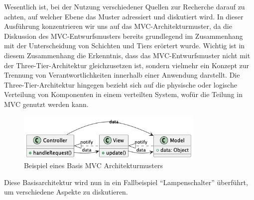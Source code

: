 \documentclass[../vs-script-first-v01.tex]{subfiles}
\begin{document}
Wesentlich ist, bei der Nutzung verschiedener Quellen zur Recherche darauf zu achten, auf welcher Ebene das Muster adressiert und diskutiert wird. In dieser Ausführung konzentrieren wir uns auf das MVC-Architekturmuster, da die Diskussion des MVC-Entwurfsmusters bereits grundlegend im Zusammenhang mit der Unterscheidung von Schichten und Tiers erörtert wurde. Wichtig ist in diesem Zusammenhang die Erkenntnis, dass das MVC-Entwurfsmuster nicht mit der Three-Tier-Architektur gleichzusetzen ist, sondern vielmehr ein Konzept zur Trennung von Verantwortlichkeiten innerhalb einer Anwendung darstellt. Die Three-Tier-Architektur hingegen bezieht sich auf die physische oder logische Verteilung von Komponenten in einem verteilten System, wofür die Teilung in MVC genutzt werden kann.
\begin{figure}[ht]
  \centering
  \includegraphics[width=0.8\textwidth]{fig/uml/default-mvc.png}
  \caption{Beispiel eines Basis MVC Architekturmusters}
  \label{fig:default-mvc}
\end{figure}

Diese Basisarchitektur wird nun in ein Fallbeispiel \enquote{Lampenschalter} überführt, um verschiedene Aspekte zu diskutieren. 
\end{document}
